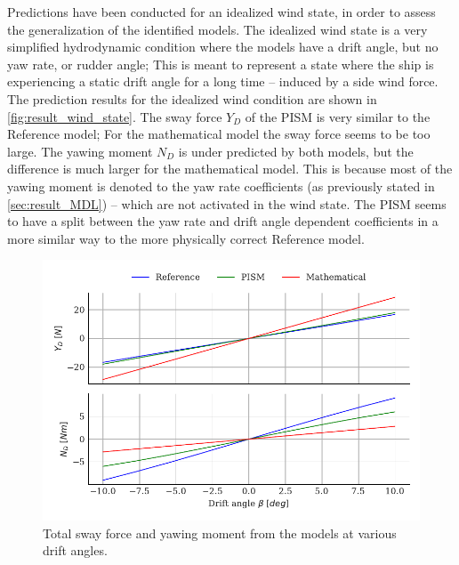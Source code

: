 Predictions have been conducted for an idealized wind state, in order to assess the generalization of the  identified models. The idealized wind state is a very simplified hydrodynamic condition where the models have a drift angle, but no yaw rate, or rudder angle; This is meant to represent a state where the ship is experiencing a static drift angle for a long time -- induced by a side wind force.
The prediction results for the idealized wind condition are shown in \autoref{fig:result_wind_state}. The sway force $Y_D$ of the PISM is very similar to the Reference model; For the mathematical model the sway force seems to be too large. The yawing moment $N_D$ is under predicted by both models, but the difference is much larger for the mathematical model. 
This is because most of the yawing moment is denoted to the yaw rate coefficients (as previously stated in \autoref{sec:result_MDL}) -- which are not activated in the wind state. 
The PISM seems to have a split between the yaw rate and drift angle dependent coefficients in a more similar way to the more physically correct Reference model.
\label{sec:wind_state}
\begin{figure}[h!]
    \includegraphics[width=\columnwidth]{figures/result_wind_state.forces.pdf}
    \caption{Total sway force and yawing moment from the models at various drift angles.}
    \label{fig:result_wind_state}
\end{figure}